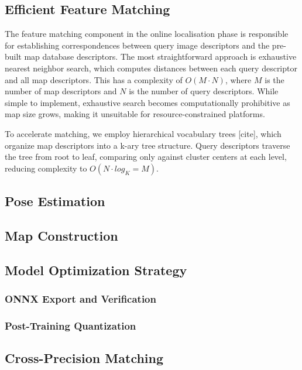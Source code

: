 \documentclass[12pt]{article}
\begin{document}
\subsection{Efficient Feature Matching}
The feature matching component in the online localisation phase is responsible for establishing correspondences between query image descriptors and the pre-built map database descriptors. The most straightforward approach is exhaustive nearest neighbor search, which computes distances between each query descriptor and all map descriptors. This has a complexity of $O(M \cdot N)$, where $M$ is the number of map descriptors and $N$ is the number of query descriptors. While simple to implement, exhaustive search becomes computationally prohibitive as map size grows, making it unsuitable for resource-constrained platforms.

To accelerate matching, we employ hierarchical vocabulary trees [cite], 
which organize map descriptors into a k-ary tree structure. Query 
descriptors traverse the tree from root to leaf, comparing only against 
cluster centers at each level, reducing complexity to $O(N\cdot log_K=M)$.




\subsection{Pose Estimation}

\subsection{Map Construction}

\subsection{Model Optimization Strategy}

\subsubsection{ONNX Export and Verification}

\subsubsection{Post-Training Quantization}

\subsection{Cross-Precision Matching}
\newpage
\end{document}
